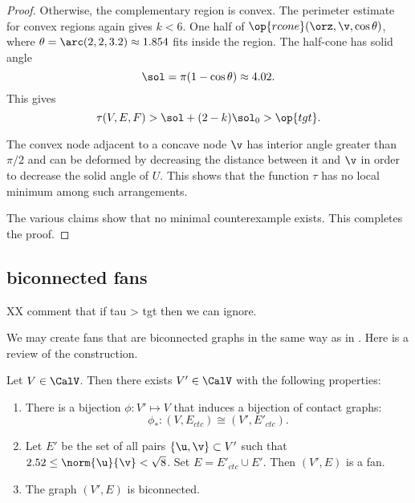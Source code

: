 \begin{proof}
  Otherwise,
the complementary region is convex.  The perimeter estimate for convex
regions again gives $k<6$.
One
half of $\op{rcone}(\orz,\v,\cos\theta)$, where
$\theta=\arc(2,2,3.2)\approx 1.854$ fits inside the region.  The
half-cone has solid angle
\[
\sol=\pi(1-\cos\theta)\approx 4.02.
\]
This gives
\[
\tau(V,E,F) > \sol + (2-k)\sol_0 > \op{tgt}.
\]
%



The convex node adjacent to a concave node $\v$ has interior angle greater
than $\pi/2$ and can be deformed by decreasing the distance between it
and $\v$ in order to decrease the solid angle of $U$.  This shows that the
function $\tau$ has no local minimum among such arrangements.


The various claims show that no minimal counterexample exists.  This
completes the proof.
\end{proof}

\subsection{biconnected fans}

\begin{remark}[$\tau$] XX comment that if tau > tgt then we can ignore.
\end{remark}

We may create  fans that are biconnected graphs in the same way as in
\cite{Hales:2006:DCG}.  Here is a review
of the construction.



\begin{lemma}\label{lemma:V'-bi} 
Let $V\in \CalV$.  Then there exists $V'\in \CalV$ with
  the following  properties:
\begin{enumerate}\wasitemize 
\item There is a bijection $\phi:V'\mapsto V$ that induces a bijection
  of contact graphs:
\[
\phi_*:(V,E_{ctc}) \cong (V',E'_{ctc}).
\]
\item Let $E'$ be the set of all pairs $\{\u,\v\}\subset V'$
  such that $2.52\le\norm{\u}{\v} <\sqrt8$.  Set $E =
  E'_{ctc}\cup E'$.  Then $(V',E)$ is a fan.
\item The graph $(V',E)$ is biconnected.
\end{enumerate}\wasitemize 
\end{lemma}

